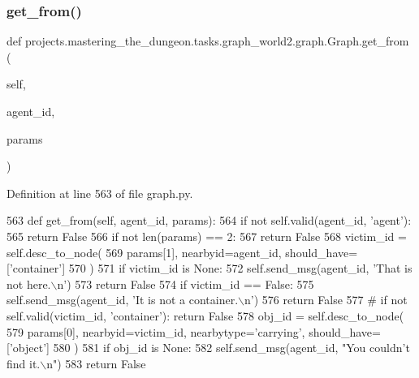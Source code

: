 \subsubsection{\texorpdfstring{get\+\_\+from()}{get\_from()}}
{\footnotesize\ttfamily def projects.\+mastering\+\_\+the\+\_\+dungeon.\+tasks.\+graph\+\_\+world2.\+graph.\+Graph.\+get\+\_\+from (\begin{DoxyParamCaption}\item[{}]{self,  }\item[{}]{agent\+\_\+id,  }\item[{}]{params }\end{DoxyParamCaption})}



Definition at line 563 of file graph.\+py.


\begin{DoxyCode}
563     \textcolor{keyword}{def }get\_from(self, agent\_id, params):
564         \textcolor{keywordflow}{if} \textcolor{keywordflow}{not} self.valid(agent\_id, \textcolor{stringliteral}{'agent'}):
565             \textcolor{keywordflow}{return} \textcolor{keyword}{False}
566         \textcolor{keywordflow}{if} \textcolor{keywordflow}{not} len(params) == 2:
567             \textcolor{keywordflow}{return} \textcolor{keyword}{False}
568         victim\_id = self.desc\_to\_node(
569             params[1], nearbyid=agent\_id, should\_have=[\textcolor{stringliteral}{'container'}]
570         )
571         \textcolor{keywordflow}{if} victim\_id \textcolor{keywordflow}{is} \textcolor{keywordtype}{None}:
572             self.send\_msg(agent\_id, \textcolor{stringliteral}{'That is not here.\(\backslash\)n'})
573             \textcolor{keywordflow}{return} \textcolor{keyword}{False}
574         \textcolor{keywordflow}{if} victim\_id == \textcolor{keyword}{False}:
575             self.send\_msg(agent\_id, \textcolor{stringliteral}{'It is not a container.\(\backslash\)n'})
576             \textcolor{keywordflow}{return} \textcolor{keyword}{False}
577         \textcolor{comment}{# if not self.valid(victim\_id, 'container'): return False}
578         obj\_id = self.desc\_to\_node(
579             params[0], nearbyid=victim\_id, nearbytype=\textcolor{stringliteral}{'carrying'}, should\_have=[\textcolor{stringliteral}{'object'}]
580         )
581         \textcolor{keywordflow}{if} obj\_id \textcolor{keywordflow}{is} \textcolor{keywordtype}{None}:
582             self.send\_msg(agent\_id, \textcolor{stringliteral}{"You couldn't find it.\(\backslash\)n"})
583             \textcolor{keywordflow}{return} \textcolor{keyword}{False}

\end{DoxyCode}

